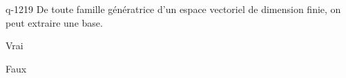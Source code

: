 \begin{truefalse}{q-1219}
De toute famille génératrice d'un espace vectoriel de dimension finie, on peut extraire une base.
\item* Vrai
\item Faux
\end{truefalse}

